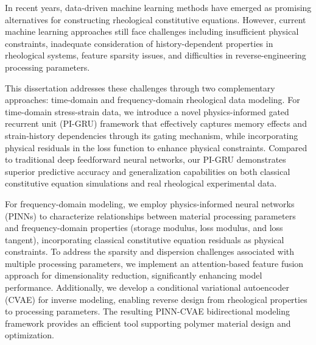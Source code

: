 In recent years, data-driven machine learning methods have emerged as promising alternatives for constructing rheological constitutive equations. However, current machine learning approaches still face challenges including insufficient physical constraints, inadequate consideration of history-dependent properties in rheological systems, feature sparsity issues, and difficulties in reverse-engineering processing parameters.

This dissertation addresses these challenges through two complementary approaches: time-domain and frequency-domain rheological data modeling. For time-domain stress-strain data, we introduce a novel physics-informed gated recurrent unit (PI-GRU) framework that effectively captures memory effects and strain-history dependencies through its gating mechanism, while incorporating physical residuals in the loss function to enhance physical constraints. Compared to traditional deep feedforward neural networks, our PI-GRU demonstrates superior predictive accuracy and generalization capabilities on both classical constitutive equation simulations and real rheological experimental data.

For frequency-domain modeling, we employ physics-informed neural networks (PINNs) to characterize relationships between material processing parameters and frequency-domain properties (storage modulus, loss modulus, and loss tangent), incorporating classical constitutive equation residuals as physical constraints. To address the sparsity and dispersion challenges associated with multiple processing parameters, we implement an attention-based feature fusion approach for dimensionality reduction, significantly enhancing model performance. Additionally, we develop a conditional variational autoencoder (CVAE) for inverse modeling, enabling reverse design from rheological properties to processing parameters. The resulting PINN-CVAE bidirectional modeling framework provides an efficient tool supporting polymer material design and optimization.
